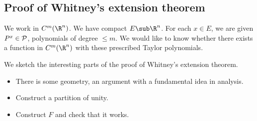 
\subsection{Proof of Whitney's extension theorem}

We work in $C^m(\R^n)$. We have compact $E\sub \R^n$. For each $x\in E$, we are given $P^x\in \cal P$, polynomials of degree $\le m$. We would like to know whether there exists a function in $C^m(\R^n)$ with these prescribed Taylor polynomials. 

We sketch the interesting parts of the proof of Whitney's extension theorem.
\begin{itemize}
\item
There is some geometry, an argument with a fundamental idea in analysis. 
\item
Construct a partition of unity.
\item
Construct $F$ and check that it works.
\end{itemize}


